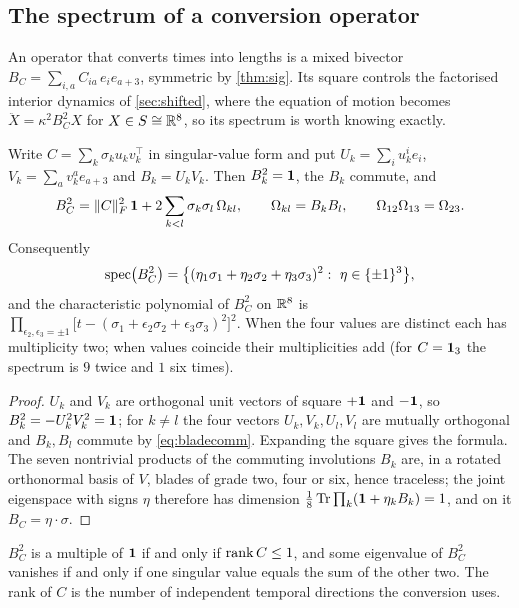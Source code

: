 \subsection{The spectrum of a conversion operator}

An operator that converts times into lengths is a mixed bivector $B_C=\sum_{i,a}C_{ia}\,e_ie_{a+3}$, symmetric by
\cref{thm:sig}. Its square controls the factorised interior dynamics of \cref{sec:shifted}, where the equation of motion becomes
$\ddot X=\kappa^2B_C^2X$ for $X\in S\cong\mathbb{R}^8$, so its spectrum is worth knowing exactly.

\begin{theorem}
\label{thm:spectrumBC}
Write $C=\sum_k\sigma_ku_kv_k^{\!\top}$ in singular-value form and put $U_k=\sum_iu_k^ie_i$, $V_k=\sum_av_k^ae_{a+3}$ and
$B_k=U_kV_k$. Then $B_k^2=\mathbf 1$, the $B_k$ commute, and
\[
B_C^2=\|C\|_F^2\,\mathbf 1+2\sum_{k<l}\sigma_k\sigma_l\,\Omega_{kl},\qquad \Omega_{kl}=B_kB_l,\qquad \Omega_{12}\Omega_{13}=\Omega_{23}.
\]
Consequently
\[
\spec\bigl(B_C^2\bigr)=\bigl\{(\eta_1\sigma_1+\eta_2\sigma_2+\eta_3\sigma_3)^2:\ \eta\in\{\pm1\}^3\bigr\},
\]
and the characteristic polynomial of $B_C^2$ on $\mathbb{R}^8$ is $\prod_{\epsilon_2,\epsilon_3=\pm1}\bigl[t-(\sigma_1+\epsilon_2\sigma_2+\epsilon_3\sigma_3)^2\bigr]^2$.
When the four values are distinct each has multiplicity two; when values coincide their multiplicities add (for $C=\mathbf 1_3$ the spectrum is
$9$ twice and $1$ six times).
\end{theorem}

\begin{proof}
$U_k$ and $V_k$ are orthogonal unit vectors of square $+\mathbf 1$ and $-\mathbf 1$, so $B_k^2=-U_k^2V_k^2=\mathbf 1$; for $k\neq l$ the four vectors
$U_k,V_k,U_l,V_l$ are mutually orthogonal and $B_k,B_l$ commute by \eqref{eq:bladecomm}. Expanding the square gives the formula. The
seven nontrivial products of the commuting involutions $B_k$ are, in a rotated orthonormal basis of $V$, blades of grade two, four
or six, hence traceless; the joint eigenspace with signs $\eta$ therefore has dimension $\tfrac18\operatorname{Tr}\prod_k(\mathbf 1+\eta_kB_k)=1$, and on it
$B_C=\eta\cdot\sigma$.
\end{proof}

\begin{corollary}
\label{cor:rankclock}
$B_C^2$ is a multiple of $\mathbf 1$ if and only if $\operatorname{rank} C\le1$, and some eigenvalue of $B_C^2$ vanishes if and only if one singular value
equals the sum of the other two. The rank of $C$ is the number of independent temporal directions the conversion uses.
\end{corollary}

